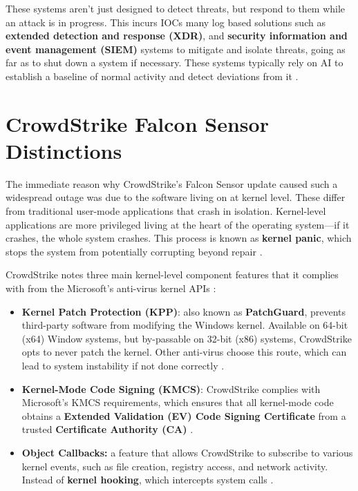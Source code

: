 These systems aren't just designed to detect threats, but respond to them while an attack is in progress. This incurs IOCs many log based solutions such as 
\textbf{extended detection and response (XDR)}, and \textbf{security information and event management (SIEM)} systems to mitigate and isolate threats, going 
as far as to shut down a system if necessary. These systems typically rely on AI to establish a baseline of normal activity and detect deviations from it \cite{microsoft_ioc}.

\section{CrowdStrike Falcon Sensor Distinctions}

The immediate reason why CrowdStrike's Falcon Sensor update caused such a widespread outage was due to
the software living on at kernel level. These differ from traditional user-mode applications that crash in isolation.
Kernel-level applications are more privileged living at the heart of the operating system---if it crashes, the whole system crashes. 
This process is known as \textbf{kernel panic}, which stops the system from potentially corrupting beyond repair \cite{awati_kernel_panic}.

CrowdStrike notes three main kernel-level component features that it complies with from the Microsoft's anti-virus kernel APIs \cite{ionescu_kernel_access_2024}:
\begin{itemize}
    \item \textbf{Kernel Patch Protection (KPP)}: also known as \textbf{PatchGuard}, prevents third-party software from modifying the Windows kernel.
    Available on 64-bit (x64) Window systems, but by-passable on 32-bit (x86) systems, CrowdStrike opts to never patch the kernel. Other 
    anti-virus choose this route, which can lead to system instability if not done correctly \cite{wikipedia_kpp}.
    \item \textbf{Kernel-Mode Code Signing (KMCS)}: CrowdStrike complies with Microsoft's KMCS requirements, which ensures that all kernel-mode code obtains a
    \textbf{Extended Validation (EV) Code Signing Certificate} from a trusted \textbf{Certificate Authority (CA)} \cite{microsoft_kmcs}\cite{reasonlabs_kernel_hooking}.
    \item \textbf{Object Callbacks:} a feature that allows CrowdStrike to subscribe to various kernel events, such as file creation, registry access, and network activity.
    Instead of \textbf{kernel hooking}, which intercepts system calls \cite{microsoft_obregistercallbacks}.
\end{itemize}

